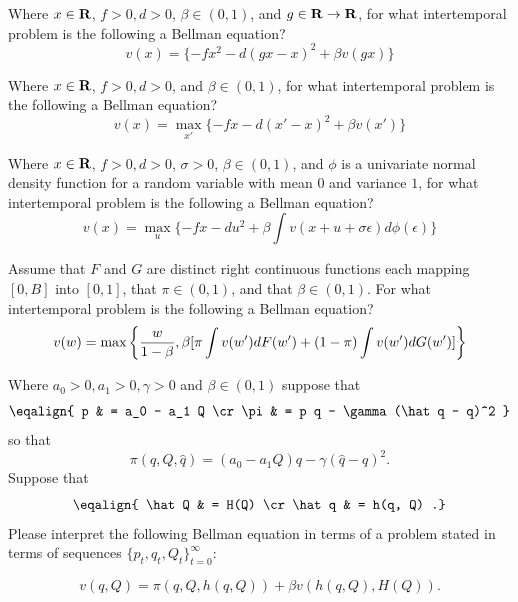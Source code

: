 \medskip
{} 
\medskip
\noindent  Where $x \in {\bf R}$, $f >0, d >0 $,   $\beta \in (0,1)$, and $g \in  {\bf R} \rightarrow {\bf R}$, 
for what intertemporal problem is the following  a Bellman equation?
$$ v(x) =  \{- f x^2 - d(gx  - x)^2 + \beta v(gx) \} $$




\medskip
{} 
\medskip
\noindent   Where $x \in {\bf R}$, $f >0, d >0 $, and   $\beta \in (0,1)$, for what intertemporal problem is the following  a Bellman equation?
$$ v(x) = \max_{x'} \{ - f x - d(x' - x)^2 + \beta v(x') \} $$





\medskip
{} 
\medskip
\noindent  Where $x \in {\bf R}$, $f >0, d >0 $, $\sigma >0$,    $\beta \in (0,1)$, and $\phi$ is a univariate normal density function for a random
variable with mean $0$ and variance $1$, for what intertemporal problem is the following  a Bellman equation?
$$ v(x) = \max_{u} \{ - f x - d u^2 + \beta \int v(x +u + \sigma \epsilon) d \phi(\epsilon) \} $$




\medskip
{} 
\medskip
\noindent  Assume that  $F$ and $G$ are distinct  right continuous functions each mapping 
$[0, B]$ into $[0,1]$, that $\pi \in (0,1)$, and  that $\beta \in (0,1)$. 
For what intertemporal problem is the following a Bellman equation?
$$ v(w) = \max\left\{ {w\over{1-\beta}},  \beta [  \pi \int v(w') d F(w') + (1-\pi) \int v(w') d G(w') ]  \right\} $$



\medskip
{} 
\medskip
\noindent Where $a_0 >0, a_1> 0, \gamma > 0$ and $\beta \in (0,1)$ suppose that
$$\eqalign{ p & = a_0 - a_1 Q \cr
           \pi &  = p q - \gamma(\hat q - q)^2 } $$
so that
$$ \pi(q, Q, \hat q) = (a_0 - a_1 Q)  q - \gamma (\hat q - q)^2 .$$
Suppose that
$$ \eqalign{ \hat Q & = H(Q) \cr
            \hat q & = h(q, Q) .} $$
Please interpret the following Bellman equation in terms of a problem stated in terms of sequences  $\{p_t, q_t, Q_t\}_{t=0}^\infty$:

$$ v(q, Q) = \pi(q,Q, h(q,Q)) + \beta v\left(h(q,Q), H(Q)\right) .$$




